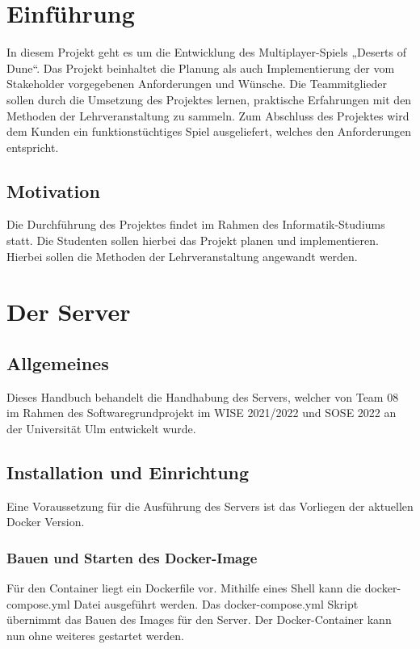 \documentclass[12pt]{article}
\newcounter{fa}
\begin{document}
\tableofcontents
\thispagestyle{empty}

\newpage

\pagestyle{fancy}

\fancyhead[R]{\thepage}
\fancyhead[L]{\leftmark}
\fancyfoot{}


\section{Einführung}

In diesem Projekt geht es um die Entwicklung des Multiplayer-Spiels „Deserts of Dune“.
Das Projekt beinhaltet die Planung als auch Implementierung der vom Stakeholder vorgegebenen
Anforderungen und Wünsche. Die Teammitglieder sollen durch die Umsetzung des Projektes lernen, praktische Erfahrungen mit den Methoden der Lehrveranstaltung zu sammeln. Zum Abschluss des Projektes wird dem Kunden ein funktionstüchtiges Spiel ausgeliefert, welches den Anforderungen entspricht.


\subsection{Motivation}

Die Durchführung des Projektes findet im Rahmen des Informatik-Studiums statt. Die Studenten sollen hierbei das Projekt planen und implementieren. Hierbei sollen die Methoden der Lehrveranstaltung angewandt werden.

\newpage


\section{Der Server}

\subsection{Allgemeines}
Dieses Handbuch behandelt die Handhabung des Servers, welcher von Team 08 im Rahmen des Softwaregrundprojekt im
WISE 2021/2022 und SOSE 2022 an der Universität Ulm entwickelt wurde.

\subsection{Installation und Einrichtung}
Eine Voraussetzung für die Ausführung des Servers ist das Vorliegen der aktuellen Docker Version.

\subsubsection{Bauen und Starten des Docker-Image}
Für den Container liegt ein Dockerfile vor. Mithilfe eines Shell kann die docker-compose.yml Datei ausgeführt werden. Das docker-compose.yml Skript übernimmt das Bauen des Images für den Server. Der Docker-Container kann nun ohne weiteres gestartet werden.
\end{document}
